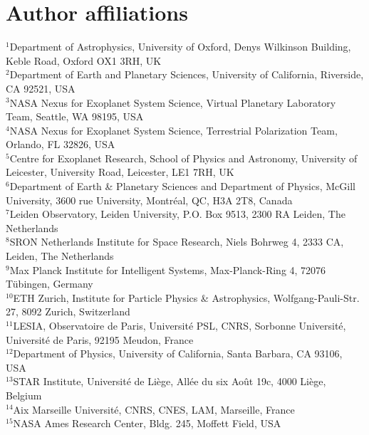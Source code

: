 \documentclass[usenatbib]{mnras}
\makeatletter
\newcommand{\affdest}[1]{\Hy@raisedlink{\hypertarget{#1}{}}$^\mathrm{#1}$}
\makeatother
\begin{document}
\section*{Author affiliations}
\begingroup
    \itshape
    \raggedright
    \affdest{1}Department of Astrophysics, University of Oxford, Denys Wilkinson Building, Keble Road, Oxford OX1 3RH, UK \\[0.5mm]
    \affdest{2}Department of Earth and Planetary Sciences, University of California, Riverside, CA 92521, USA \\[0.5mm]
    \affdest{3}NASA Nexus for Exoplanet System Science, Virtual Planetary Laboratory Team, Seattle, WA 98195, USA \\[0.5mm]
    \affdest{4}NASA Nexus for Exoplanet System Science, Terrestrial Polarization Team, Orlando, FL 32826, USA \\[0.5mm]
    \affdest{5}Centre for Exoplanet Research, School of Physics and Astronomy, University of Leicester, University Road, Leicester, LE1 7RH, UK \\[0.5mm]
    \affdest{6}Department of Earth \& Planetary Sciences and Department of Physics, McGill University, 3600 rue University, Montréal, QC, H3A 2T8, Canada \\[0.5mm]
    \affdest{7}Leiden Observatory, Leiden University, P.O. Box 9513, 2300 RA Leiden, The Netherlands \\[0.5mm]
    \affdest{8}SRON Netherlands Institute for Space Research, Niels Bohrweg 4, 2333 CA, Leiden, The Netherlands \\[0.5mm]
    \affdest{9}Max Planck Institute for Intelligent Systems, Max-Planck-Ring 4, 72076 Tübingen, Germany \\[0.5mm]
    \affdest{10}ETH Zurich, Institute for Particle Physics \& Astrophysics, Wolfgang-Pauli-Str. 27, 8092 Zurich, Switzerland \\[0.5mm]
    \affdest{11}LESIA, Observatoire de Paris, Université PSL, CNRS, Sorbonne Université, Université de Paris, 92195 Meudon, France \\[0.5mm]
    \affdest{12}Department of Physics, University of California, Santa Barbara, CA 93106, USA \\[0.5mm]
    \affdest{13}STAR Institute, Université de Liège, Allée du six Août 19c, 4000 Liège, Belgium \\[0.5mm]
    \affdest{14}Aix Marseille Université, CNRS, CNES, LAM, Marseille, France \\[0.5mm]
    \affdest{15}NASA Ames Research Center, Bldg. 245, Moffett Field, USA \\[0.5mm]
\end{document}
